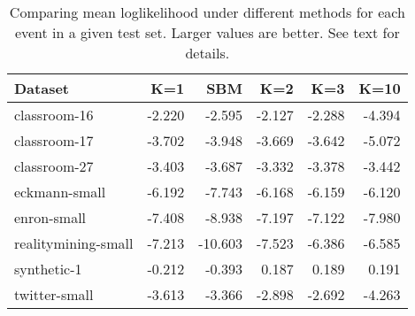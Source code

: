 \begin{table}[t]
\begin{center}
{\footnotesize
\begin{tabular}{lrrrrr}
  \hline
Dataset & K=1 & SBM & K=2 & K=3 & K=10 \\ 
  \hline
classroom-16 & -2.220 & -2.595 & -2.127 & -2.288 & -4.394 \\ 
  classroom-17 & -3.702 & -3.948 & -3.669 & -3.642 & -5.072 \\ 
  classroom-27 & -3.403 & -3.687 & -3.332 & -3.378 & -3.442 \\ 
  eckmann-small & -6.192 & -7.743 & -6.168 & -6.159 & -6.120 \\ 
  enron-small & -7.408 & -8.938 & -7.197 & -7.122 & -7.980 \\ 
  realitymining-small & -7.213 & -10.603 & -7.523 & -6.386 & -6.585 \\ 
  synthetic-1 & -0.212 & -0.393 & 0.187 & 0.189 & 0.191 \\ 
  twitter-small & -3.613 & -3.366 & -2.898 & -2.692 & -4.263 \\ 
   \hline
\end{tabular}
}
\caption{Comparing mean loglikelihood under different methods for each event in a given test set.  Larger values are better.  See text for details.}
\label{tab:results}
\end{center}
\end{table}
